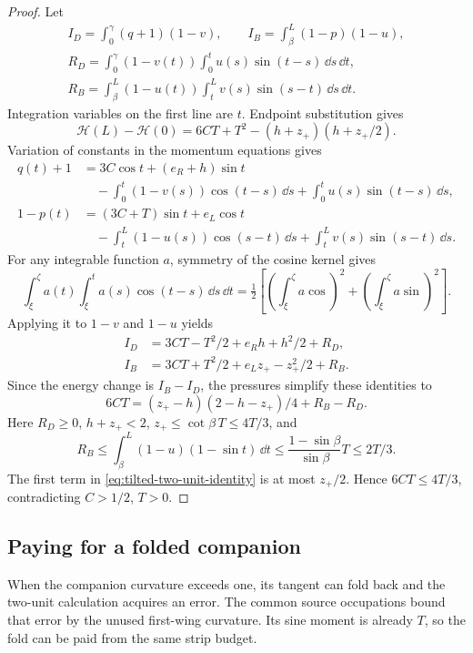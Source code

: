 \begin{proof}
Let
\begin{equation}\label{eq:tilted-flux-remainders}
 \begin{gathered}
 I_D=\int_0^\gamma(q+1)(1-v),\qquad
 I_B=\int_\beta^L(1-p)(1-u),\\
 R_D=\int_0^\gamma(1-v(t))\int_0^t u(s)\sin(t-s)\,\dd s\,\dd t,\\
 R_B=\int_\beta^L(1-u(t))\int_t^L v(s)\sin(s-t)\,\dd s\,\dd t.
 \end{gathered}
\end{equation}
Integration variables on the first line are $t$.
Endpoint substitution gives
\[
 \mathcal H(L)-\mathcal H(0)
   =6CT+T^2-(h+z_+)(h+z_+/2).
\]
Variation of constants in the momentum equations gives
\begin{align*}
 q(t)+1&=3C\cos t+(e_R+h)\sin t\\
   &\quad-\int_0^t(1-v(s))\cos(t-s)\,\dd s
         +\int_0^t u(s)\sin(t-s)\,\dd s,\\
 1-p(t)&=(3C+T)\sin t+e_L\cos t\\
   &\quad-\int_t^L(1-u(s))\cos(s-t)\,\dd s
         +\int_t^L v(s)\sin(s-t)\,\dd s.
\end{align*}
For any integrable function $a$, symmetry of the cosine kernel gives
\[
 \int_\xi^\zeta a(t)\int_\xi^t a(s)\cos(t-s)\,\dd s\,\dd t
 =\tfrac12\left[(\int_\xi^\zeta a\cos)^2
                       +(\int_\xi^\zeta a\sin)^2\right].
\]
Applying it to $1-v$ and
$1-u$ yields
\[
 \begin{aligned}
 I_D&=3CT-T^2/2+e_Rh+h^2/2+R_D,\\
 I_B&=3CT+T^2/2+e_Lz_+-z_+^2/2+R_B.
 \end{aligned}
\]
Since the energy change is $I_B-I_D$, the pressures simplify
these identities to
\begin{equation}\label{eq:tilted-two-unit-identity}
 6CT=(z_+-h)(2-h-z_+)/4+R_B-R_D.
\end{equation}
Here $R_D\ge0$, $h+z_+<2$,
$z_+\le\cot\beta\,T\le4T/3$, and
\[
 R_B\le\int_\beta^L(1-u)(1-\sin t)\,\dd t
      \le\frac{1-\sin\beta}{\sin\beta}T\le2T/3.
\]
The first term in \cref{eq:tilted-two-unit-identity} is at most
$z_+/2$. Hence $6CT\le4T/3$, contradicting $C>1/2$, $T>0$.
\end{proof}

\subsection{Paying for a folded companion}

When the companion curvature exceeds one, its tangent can fold back
and the two-unit calculation acquires an error. The common source
occupations bound that error by the unused first-wing curvature. Its
sine moment is already $T$, so the fold can be paid from the same
strip budget.

